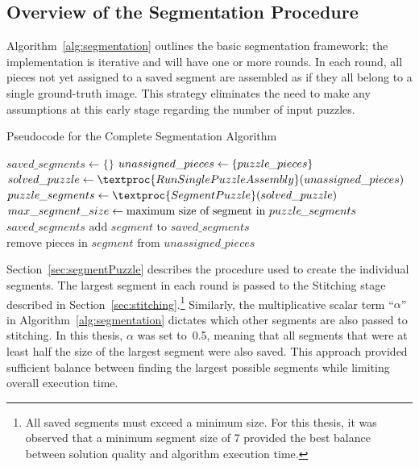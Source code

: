 \subsection{Overview of the Segmentation Procedure}

Algorithm~\ref{alg:segmentation} outlines the basic segmentation framework; the implementation is iterative and will have one or more rounds.  In each round, all pieces not yet assigned to a saved segment are assembled as if they all belong to a single ground-truth image.  This strategy eliminates the need to make any assumptions at this early stage regarding the number of input puzzles. 

\begin{algorithm}[t]
    \caption{Pseudocode for the Complete Segmentation Algorithm}\label{alg:segmentation}
    \begin{algorithmic}[1]
        \State $saved\_segments \gets \{ \}$
        \State $unassigned\_pieces \gets \{ puzzle\hspace{-0.8pt}\_pieces \}$
        \Loop
            \State $solved\_puzzle \gets \textproc{RunSinglePuzzleAssembly}(unassigned\_pieces)$
            \State $puzzle\hspace{-0.8pt}\_segments \gets \textproc{SegmentPuzzle}(solved\_puzzle)$
            \State $max\_segment\_size \gets \text{maximum size of segment in } puzzle\hspace{-0.8pt}\_segments$
                \State \Return $saved\_segments$
            \EndIf
                    \State $\text{add } segment \text{ to } saved\_segments$
                    \State $\text{remove pieces in } segment \text{ from } unassigned\_pieces$
                \EndIf
            \EndFor
        \EndLoop
        \EndFunction
    \end{algorithmic}
\end{algorithm}

Section~\ref{sec:segmentPuzzle} describes the procedure used to create the individual segments. The largest segment in each round is passed to the Stitching stage described in Section~\ref{sec:stitching}.\footnote{All saved segments must exceed a minimum size.  For this thesis, it was observed that a minimum segment size of 7 provided the best balance between solution quality and algorithm execution time.} Similarly, the multiplicative scalar term ``\textit{$\alpha$}'' in Algorithm~\ref{alg:segmentation} dictates which other segments are also passed to stitching.  In this thesis, \textit{$\alpha$} was set to~0.5, meaning that all segments that were at least half the size of the largest segment were also saved.  This approach provided sufficient balance between finding the largest possible segments while limiting overall execution time.

